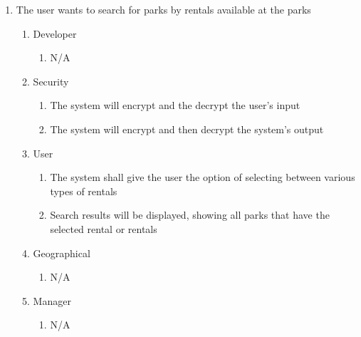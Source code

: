 \documentclass[titlepage]{article}
\begin{document}
\begin{enumerate}[{BE}1.]
    \item The user wants to search for parks by rentals available at the parks
    \begin{enumerate}[{VP\theenumi}.1]
        \item Developer
            \begin{enumerate}
                \item N/A
            \end{enumerate}
        \item Security
            \begin{enumerate}
                \item The system will encrypt and the decrypt the user's input
                \item The system will encrypt and then decrypt the system's output
            \end{enumerate}
        \item User
            \begin{enumerate}
                \item The system shall give the user the option of selecting between various types
                of rentals
                \item Search results will be displayed, showing all parks that have the selected
                rental or rentals
            \end{enumerate}
        \item Geographical
            \begin{enumerate}
                \item N/A
            \end{enumerate}
        \item Manager
            \begin{enumerate}
                \item N/A
            \end{enumerate}
    \end{enumerate}


\end{enumerate}
\end{document}
